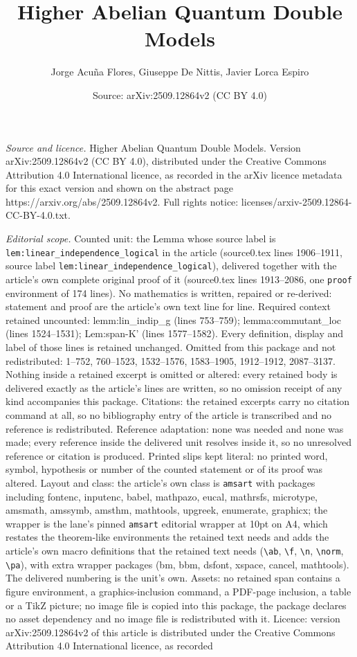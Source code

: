 \documentclass[10pt,a4paper]{amsart}
\title[Higher Abelian Quantum Double Models]{Higher Abelian Quantum Double Models}
\author{Jorge Acu\~na Flores, Giuseppe De Nittis, Javier Lorca Espiro}
\date{Source: arXiv:2509.12864v2 (CC BY 4.0)}
\begin{document}
\maketitle

\noindent\emph{Source and licence.} Higher Abelian Quantum Double Models. Version arXiv:2509.12864v2 (CC BY 4.0), distributed under the Creative Commons Attribution 4.0 International licence, as recorded in the arXiv licence metadata for this exact version and shown on the abstract page https://arxiv.org/abs/2509.12864v2. Full rights notice: licenses/arxiv-2509.12864-CC-BY-4.0.txt.\par\smallskip

\noindent\textit{Editorial scope.} Counted unit: the Lemma whose source label is \texttt{lem:linear\_independence\_logical} in the article (source0.tex lines 1906--1911, source label \texttt{lem:linear\_independence\_logical}), delivered together with the article's own complete original proof of it (source0.tex lines 1913--2086, one \texttt{proof} environment of 174 lines). No mathematics is written, repaired or re-derived: statement and proof are the article's own text line for line. Required context retained uncounted: lemm:lin\_indip\_g (lines 753--759); lemma:commutant\_loc (lines 1524--1531); Lem:span-K' (lines 1577--1582). Every definition, display and label of those lines is retained unchanged. Omitted from this package and not redistributed: 1--752, 760--1523, 1532--1576, 1583--1905, 1912--1912, 2087--3137. Nothing inside a retained excerpt is omitted or altered: every retained body is delivered exactly as the article's lines are written, so no omission receipt of any kind accompanies this package. Citations: the retained excerpts carry no citation command at all, so no bibliography entry of the article is transcribed and no reference is redistributed. Reference adaptation: none was needed and none was made; every reference inside the delivered unit resolves inside it, so no unresolved reference or citation is produced. Printed slips kept literal: no printed word, symbol, hypothesis or number of the counted statement or of its proof was altered. Layout and class: the article's own class is \texttt{amsart} with packages including fontenc, inputenc, babel, mathpazo, eucal, mathrsfs, microtype, amsmath, amssymb, amsthm, mathtools, upgreek, enumerate, graphicx; the wrapper is the lane's pinned \texttt{amsart} editorial wrapper at 10pt on A4, which restates the theorem-like environments the retained text needs and adds the article's own macro definitions that the retained text needs (\texttt{\textbackslash ab}, \texttt{\textbackslash f}, \texttt{\textbackslash n}, \texttt{\textbackslash norm}, \texttt{\textbackslash pa}), with extra wrapper packages (bm, bbm, dsfont, xspace, cancel, mathtools). The delivered numbering is the unit's own. Assets: no retained span contains a figure environment, a graphics-inclusion command, a PDF-page inclusion, a table or a TikZ picture; no image file is copied into this package, the package declares no asset dependency and no image file is redistributed with it. Licence: version arXiv:2509.12864v2 of this article is distributed under the Creative Commons Attribution 4.0 International licence, as recorded 
\end{document}
